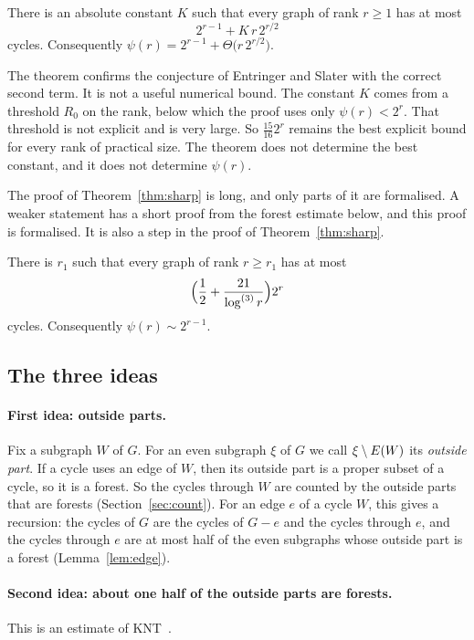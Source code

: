 \begin{theorem}\label{thm:sharp}
There is an absolute constant $K$ such that every graph of rank $r\ge1$ has at most
\[
  2^{r-1}+K\,r\,2^{r/2}
\]
cycles. Consequently $\psi(r)=2^{r-1}+\Theta\bigl(r\,2^{r/2}\bigr)$.
\end{theorem}

The theorem confirms the conjecture of Entringer and Slater with the correct second term. It is not
a useful numerical bound. The constant $K$ comes from a threshold $R_0$ on the rank, below which the
proof uses only $\psi(r)<2^{r}$. That threshold is not explicit and is very large. So
$\frac{15}{16}2^{r}$ remains the best explicit bound for every rank of practical size. The theorem
does not determine the best constant, and it does not determine $\psi(r)$.

The proof of Theorem~\ref{thm:sharp} is long, and only parts of it are formalised. A weaker
statement has a short proof from the forest estimate below, and this proof is formalised. It is also
a step in the proof of Theorem~\ref{thm:sharp}.

\begin{theorem}\label{thm:cycles}
There is $r_1$ such that every graph of rank $r\ge r_1$ has at most
\[
  \Bigl(\frac12+\frac{21}{\log^{(3)}r}\Bigr)2^{r}
\]
cycles. Consequently $\psi(r)\sim2^{r-1}$.
\end{theorem}

\subsection{The three ideas}

\paragraph{First idea: outside parts.}
Fix a subgraph $W$ of $G$. For an even subgraph $\xi$ of $G$ we call $\xi\setminus E(W)$ its
\emph{outside part}. If a cycle uses an edge of $W$, then its outside part is a proper subset of a
cycle, so it is a forest. So the cycles through $W$ are counted by the outside parts that are
forests (Section~\ref{sec:count}). For an edge $e$ of a cycle $W$, this gives a recursion: the
cycles of $G$ are the cycles of $G-e$ and the cycles through $e$, and the cycles through $e$ are at
most half of the even subgraphs whose outside part is a forest (Lemma~\ref{lem:edge}).

\paragraph{Second idea: about one half of the outside parts are forests.}
This is an estimate of KNT~\cite{KNT}.


